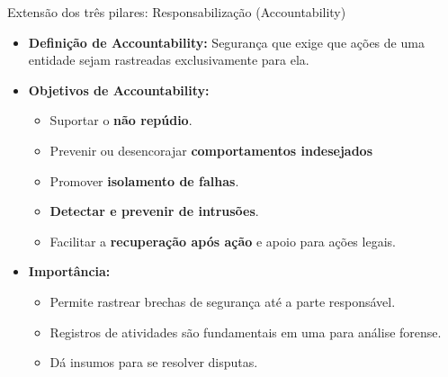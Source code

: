 \begin{frame}{Extensão dos três pilares: Responsabilização (Accountability)}

  \begin{itemize}
    \item \textbf{Definição de Accountability:} Segurança que exige que ações de uma entidade sejam rastreadas exclusivamente para ela.
    \item \textbf{Objetivos de Accountability:}
    \begin{itemize}
      \item Suportar o \textbf{não repúdio}.
      \item Prevenir ou desencorajar \textbf{comportamentos indesejados}
      \item Promover  \textbf{isolamento de falhas}.
      \item \textbf{Detectar e prevenir de intrusões}.
      \item Facilitar a \textbf{recuperação após ação} e apoio para ações legais.
    \end{itemize}
    \item \textbf{Importância:}
    \begin{itemize}
      \item Permite rastrear brechas de segurança até a parte responsável.
      \item Registros de atividades são fundamentais em uma para análise forense.
      \item Dá insumos para se resolver disputas.
    \end{itemize}
  \end{itemize}
  
\end{frame}


